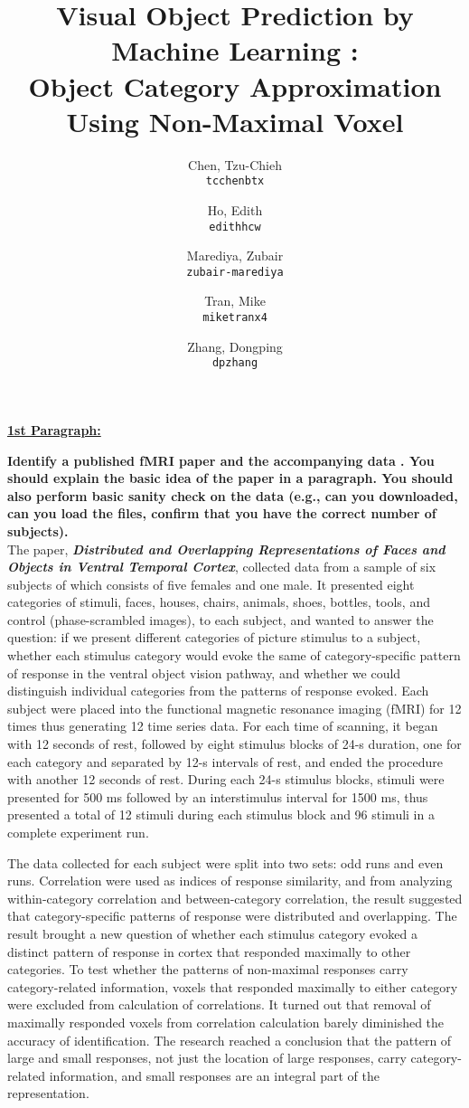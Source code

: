 \documentclass[11pt]{article}
\title{Visual Object Prediction by Machine Learning : \\ 
Object Category Approximation Using Non-Maximal Voxel}
\author{
  Chen, Tzu-Chieh\\
  \texttt{tcchenbtx}
  \and
  Ho, Edith\\
  \texttt{edithhcw}
  \and
  Marediya, Zubair\\
  \texttt{zubair-marediya}
  \and
  Tran, Mike\\
  \texttt{miketranx4}
  \and
  Zhang, Dongping\\
  \texttt{dpzhang}
}
\begin{document}
\maketitle

\textbf{\underline{1st Paragraph:}} 

\textbf{Identify a published fMRI paper and the accompanying data
\cite{lindquist2008statistical}.  You should explain the basic idea of the
paper in a paragraph. You should also perform basic sanity check on the data
(e.g., can you downloaded, can you load the files, confirm that you have the
correct number of subjects).}\\

The paper, \textbf{\emph{Distributed and Overlapping Representations of Faces
and Objects in Ventral Temporal Cortex}}\cite{object_rec_main}, collected data 
from a sample of six subjects of which consists of five females and one male. It 
presented eight categories of stimuli, faces, houses, chairs, animals, shoes, 
bottles, tools, and control (phase-scrambled images), to each subject, and 
wanted to answer the question: if we present different categories of picture 
stimulus to a subject, whether each stimulus category would evoke the same of 
category-specific pattern of response in the ventral object vision pathway, and 
whether we could distinguish individual categories from the patterns of response 
evoked. Each subject were placed into the functional magnetic resonance imaging 
(fMRI) for 12 times thus generating 12 time series data. For each time of scanning, 
it began with 12 seconds of rest, followed by eight stimulus blocks of 24-s 
duration, one for each category and separated by 12-s intervals of rest, and 
ended the procedure with another 12 seconds of rest. During each 24-s stimulus 
blocks, stimuli were presented for 500 ms followed by an interstimulus interval 
for 1500 ms, thus presented a total of 12 stimuli during each stimulus block 
and 96 stimuli in a complete experiment run.

The data collected for each subject were split into two sets: odd runs and even 
runs. Correlation were used as indices of response similarity, and from 
analyzing within-category correlation and between-category correlation, the 
result suggested that category-specific patterns of response were distributed 
and overlapping. The result brought a new question of whether each stimulus 
category evoked a distinct pattern of response in cortex that responded 
maximally to other categories. To test whether the patterns of non-maximal 
responses carry category-related information, voxels that responded maximally 
to either category were excluded from calculation of correlations. It turned 
out that removal of maximally responded voxels from correlation calculation 
barely diminished the accuracy of identification. The research reached a 
conclusion that the pattern of large and small responses, not just the location 
of large responses, carry category-related information, and small responses 
are an integral part of the representation.\\
\end{document}
